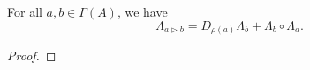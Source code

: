\documentclass[10pt,a4paper]{amsart}
\newcommand{\E}{\mathcal{E}}
\begin{document}
\begin{lemma}
For all \(a,b\in\Gamma(A)\), we have
\begin{equation}
\Lambda_{a\triangleright b}
=
D_{\rho(a)}\Lambda_b
+
\Lambda_b\circ\Lambda_a.
\label{eq:Lambda-product-identity}
\end{equation}
\end{lemma}

\begin{proof}


\end{proof}
\end{document}
